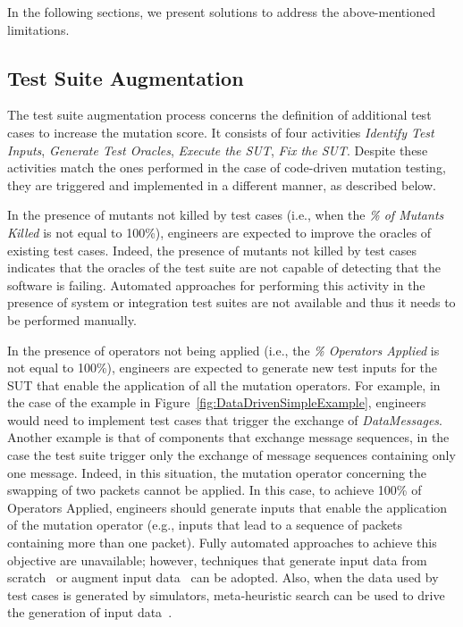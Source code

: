 In the following sections, we present solutions to address the above-mentioned limitations.


\subsection{Test Suite Augmentation} %
\label{sec:data:test_suite_augmentation}

The test suite augmentation process concerns the definition of additional test cases to increase the mutation score.
It consists of four activities \emph{Identify Test Inputs}, \emph{Generate Test Oracles}, \emph{Execute the SUT}, \emph{Fix the SUT}. 
Despite these activities match the ones performed in the case of code-driven mutation testing, they are triggered and implemented in a different manner, as described below.




In the presence of mutants not killed by test cases (i.e., when the \emph{\% of Mutants Killed} is not equal to 100\%), engineers are expected to improve the oracles of existing test cases. Indeed, the presence of mutants not killed by test cases indicates that the oracles of the test suite are not capable of detecting that the software is failing. 
Automated approaches for performing this activity in the presence of system or integration test suites are not available and thus it needs to be performed manually.

In the presence of operators not being applied (i.e., the \emph{\% Operators Applied} is not equal to 100\%), engineers are expected to generate new test inputs for the SUT that enable the application of all the mutation operators. 
For example, in the case of the example in Figure~\ref{fig:DataDrivenSimpleExample}, engineers would need to implement test cases that trigger the exchange of \emph{DataMessages}.
Another example is that of components that exchange message sequences, in the case the test suite trigger only the exchange of message sequences containing only one message. 
Indeed, in this situation, the mutation operator concerning the swapping of two packets cannot be applied. In this case, to achieve 100\% of Operators Applied, engineers should generate inputs that enable the application of the mutation operator (e.g., inputs that lead to a sequence of packets containing more than one packet). 
Fully automated approaches to achieve this objective are unavailable; however, techniques that generate input data from scratch~\cite{gligoric2010test} or augment input data~\cite{DiNardo:TOSEM:2017} can be adopted. 
Also, when the data used by test cases is generated by simulators, meta-heuristic search can be used to drive the generation of input data~\cite{Abdessalem:ICSE:2018}. 

